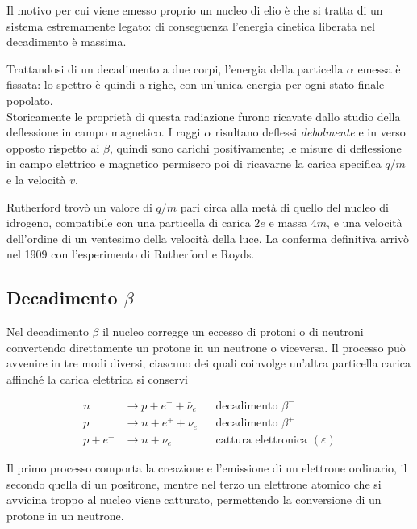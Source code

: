 Il motivo per cui viene emesso proprio un nucleo di elio è che si tratta di un sistema estremamente legato: di conseguenza l'energia cinetica liberata nel decadimento è massima.

Trattandosi di un decadimento a due corpi, l'energia della particella $\alpha$ emessa è fissata: lo spettro è quindi a righe, con un'unica energia per ogni stato finale popolato. \\

Storicamente le proprietà di questa radiazione furono ricavate dallo studio della deflessione in campo magnetico. I raggi $\alpha$ risultano deflessi \emph{debolmente} e in verso opposto rispetto ai $\beta$, quindi sono carichi positivamente; le misure di deflessione in campo elettrico e magnetico permisero poi di ricavarne la carica specifica $q/m$ e la velocità $v$. 

Rutherford trovò un valore di $q/m$ pari circa alla metà di quello del nucleo di idrogeno, compatibile con una particella di carica $2e$ e massa $4m$, e una velocità dell'ordine di un ventesimo della velocità della luce. La conferma definitiva arrivò nel 1909 con l'esperimento di Rutherford e Royds.

\subsection{Decadimento $\beta$}

Nel decadimento $\beta$ il nucleo corregge un eccesso di protoni o di neutroni convertendo direttamente un protone in un neutrone o viceversa. Il processo può avvenire in tre modi diversi, ciascuno dei quali coinvolge un'altra particella carica affinché la carica elettrica si conservi
%
\begin{tcolorbox}[colback=black!5!white, colframe=black!45!white, boxrule=0.8pt]
\begin{equation}
\begin{aligned}
    n & \longrightarrow p + e^- + \bar{\nu}_e && \text{decadimento } \beta^- \\
    p & \longrightarrow n + e^+ + \nu_e && \text{decadimento } \beta^+ \\
    p + e^- & \longrightarrow n + \nu_e && \text{cattura elettronica } (\varepsilon)
\end{aligned}
\end{equation}
\end{tcolorbox}
Il primo processo comporta la creazione e l'emissione di un elettrone ordinario, il secondo quella di un positrone, mentre nel terzo un elettrone atomico che si avvicina troppo al nucleo viene catturato, permettendo la conversione di un protone in un neutrone. 

